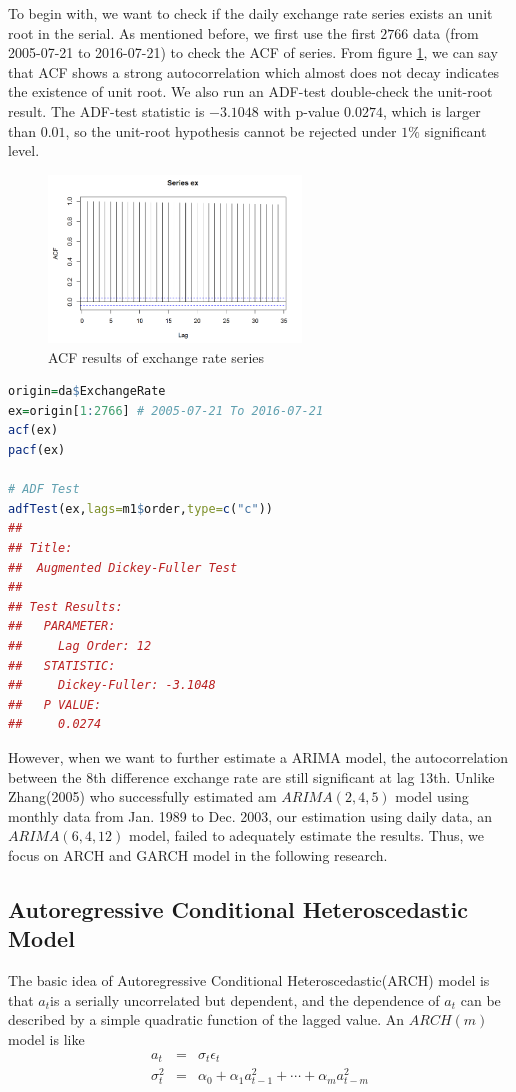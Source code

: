 \documentclass[12pt, a4paper, titlepage]{article}
\begin{document}
To begin with, we want to check if the daily exchange rate series exists an unit root in the serial. As mentioned before, we first use the first $2766$ data (from 2005-07-21 to 2016-07-21) to check the ACF of series. From figure \ref{ACF}, we can say that ACF shows a strong autocorrelation which almost does not decay indicates the existence of unit root. We also run an ADF-test double-check the unit-root result. The ADF-test statistic is $-3.1048$ with p-value $0.0274$, which is larger than $0.01$, so the unit-root hypothesis cannot be rejected under $1\%$ significant level.\\
\begin{figure}[h!]
\begin{center}
\caption{ACF results of exchange rate series}\label{ACF}
\includegraphics[width=0.6\textwidth]{ex_acf.png} 
\end{center}
\end{figure}
\begin{lstlisting}[language=R] 
origin=da$ExchangeRate
ex=origin[1:2766] # 2005-07-21 To 2016-07-21
acf(ex)
pacf(ex)

# ADF Test
adfTest(ex,lags=m1$order,type=c("c"))
## 
## Title:
##  Augmented Dickey-Fuller Test
## 
## Test Results:
##   PARAMETER:
##     Lag Order: 12
##   STATISTIC:
##     Dickey-Fuller: -3.1048
##   P VALUE:
##     0.0274 
\end{lstlisting}

However, when we want to further estimate a ARIMA model, the autocorrelation between the 8th difference exchange rate are still significant at lag 13th. Unlike Zhang(2005) who successfully estimated am $ARIMA(2,4,5)$ model using monthly data from Jan. 1989 to Dec. 2003, our estimation using daily data, an $ARIMA(6,4,12)$ model, failed to adequately estimate the results. Thus, we focus on ARCH and GARCH model in the following research.

\subsection{Autoregressive Conditional Heteroscedastic Model}
The basic idea of Autoregressive Conditional Heteroscedastic(ARCH) model is that ${a_t}$is a serially uncorrelated but dependent, and the dependence of $a_t$ can be described by a simple quadratic function of the lagged value. An $ARCH(m)$ model is like
\begin{eqnarray*}
a_t &=& \sigma_t \epsilon_t \\
\sigma_t^2 &=& \alpha_0 + \alpha_1 a_{t-1}^2 + \cdots +\alpha_m a_{t-m}^2
\end{eqnarray*}
\end{document}
